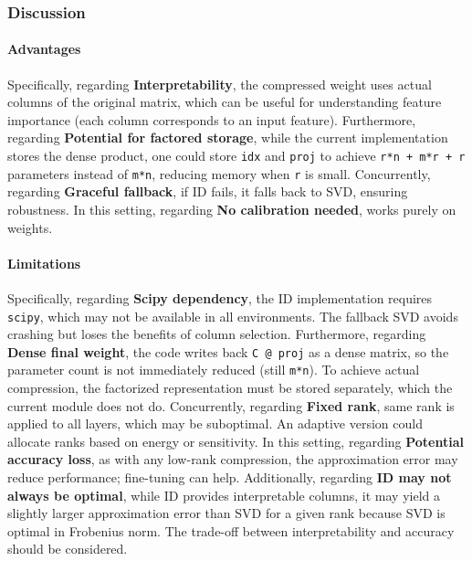 \subsubsection*{Discussion}

\paragraph{Advantages}

Specifically, regarding \textbf{Interpretability}, the compressed weight uses actual columns of the original matrix, which can be useful for understanding feature importance (each column corresponds to an input feature). Furthermore, regarding \textbf{Potential for factored storage}, while the current implementation stores the dense product, one could store \texttt{idx} and \texttt{proj} to achieve \texttt{r*n + m*r + r} parameters instead of \texttt{m*n}, reducing memory when \texttt{r} is small. Concurrently, regarding \textbf{Graceful fallback}, if ID fails, it falls back to SVD, ensuring robustness. In this setting, regarding \textbf{No calibration needed}, works purely on weights.


\paragraph{Limitations}

Specifically, regarding \textbf{Scipy dependency}, the ID implementation requires \texttt{scipy}, which may not be available in all environments. The fallback SVD avoids crashing but loses the benefits of column selection. Furthermore, regarding \textbf{Dense final weight}, the code writes back \texttt{C @ proj} as a dense matrix, so the parameter count is not immediately reduced (still \texttt{m*n}). To achieve actual compression, the factorized representation must be stored separately, which the current module does not do. Concurrently, regarding \textbf{Fixed rank}, same rank is applied to all layers, which may be suboptimal. An adaptive version could allocate ranks based on energy or sensitivity. In this setting, regarding \textbf{Potential accuracy loss}, as with any low-rank compression, the approximation error may reduce performance; fine-tuning can help. Additionally, regarding \textbf{ID may not always be optimal}, while ID provides interpretable columns, it may yield a slightly larger approximation error than SVD for a given rank because SVD is optimal in Frobenius norm. The trade-off between interpretability and accuracy should be considered.


